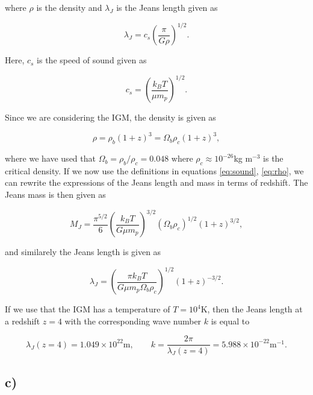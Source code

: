 \documentclass[a4paper]{article}
\begin{document}
\noindent where $\rho$ is the density and $\lambda_J$ is the Jeans length given as

\begin{equation}\label{eq:jeanlen}
    \lambda_J = c_s \left(\frac{\pi}{G \rho} \right)^{1/2}.
\end{equation}

\noindent Here, $c_s$ is the speed of sound given as

\begin{equation}\label{eq:sound}
    c_s = \left( \frac{k_B T}{\mu m_p} \right)^{1/2}.
\end{equation}

\noindent Since we are considering the IGM, the density is given as

\begin{equation}\label{eq:rho}
    \rho = \rho_b(1+z)^3 = \Omega_b \rho_c (1+z)^3,
\end{equation}

\noindent where we have used that $\Omega_b = \rho_b / \rho_c = 0.048$ where $\rho_c \approx 10^{-26}$kg m$^{-3}$ is the critical density. If we now use the definitions in equations \eqref{eq:sound}, \eqref{eq:rho}, we can rewrite the expressions of the Jeans length and mass in terms of redshift. The Jeans mass is then given as

\begin{equation}\label{eq:jeanfinal}
    M_J = \frac{\pi^{5/2}}{6} \left( \frac{k_B T}{G \mu m_p} \right)^{3/2} (\Omega_b \rho_c)^{1/2} (1+z)^{3/2},
\end{equation}

\noindent and similarely the Jeans length is given as

\begin{equation}\label{eq:jeanlenfinal}
    \lambda_J = \left( \frac{\pi k_B T}{G \mu m_p \Omega_b \rho_c} \right)^{1/2} (1+z)^{-3/2}.
\end{equation}

\noindent If we use that the IGM has a temperature of $T = 10^4$K, then the Jeans length at a redshift $z = 4$ with the corresponding wave number $k$ is equal to 

\begin{equation}\label{eq:jeans z=4}
    \lambda_J(z=4) = 1.049 \times 10^{22}\mathrm{m}, \qquad k = \frac{2\pi}{\lambda_J(z = 4)} = 5.988 \times 10^{-22}\mathrm{m}^{-1}.
\end{equation}

\subsection*{c)}
\end{document}

